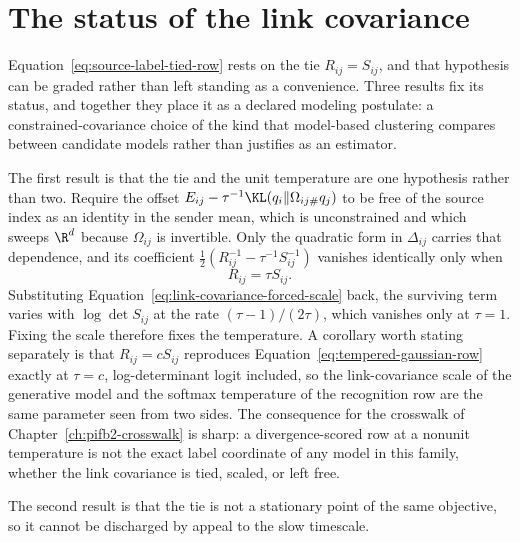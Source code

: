 \section{The status of the link covariance}
\label{sec:link-covariance-status}

Equation~\eqref{eq:source-label-tied-row} rests on the tie \(R_{ij}=S_{ij}\), and that hypothesis can be graded rather than left standing as a convenience. Three results fix its status, and together they place it as a declared modeling postulate: a constrained-covariance choice of the kind that model-based clustering compares between candidate models rather than justifies as an estimator.

The first result is that the tie and the unit temperature are one hypothesis rather than two. Require the offset \(E_{ij}-\tau^{-1}\KL(q_i\Vert\Omega_{ij\#}q_j)\) to be free of the source index as an identity in the sender mean, which is unconstrained and which sweeps \(\R^d\) because \(\Omega_{ij}\) is invertible. Only the quadratic form in \(\Delta_{ij}\) carries that dependence, and its coefficient \(\tfrac12(R_{ij}^{-1}-\tau^{-1}S_{ij}^{-1})\) vanishes identically only when
\begin{equation}
R_{ij}=\tau S_{ij}.
\label{eq:link-covariance-forced-scale}
\end{equation}
Substituting Equation~\eqref{eq:link-covariance-forced-scale} back, the surviving term varies with \(\log\det S_{ij}\) at the rate \((\tau-1)/(2\tau)\), which vanishes only at \(\tau=1\). Fixing the scale therefore fixes the temperature. A corollary worth stating separately is that \(R_{ij}=cS_{ij}\) reproduces Equation~\eqref{eq:tempered-gaussian-row} exactly at \(\tau=c\), log-determinant logit included, so the link-covariance scale of the generative model and the softmax temperature of the recognition row are the same parameter seen from two sides. The consequence for the crosswalk of Chapter~\ref{ch:pifb2-crosswalk} is sharp: a divergence-scored row at a nonunit temperature is not the exact label coordinate of any model in this family, whether the link covariance is tied, scaled, or left free.

The second result is that the tie is not a stationary point of the same objective, so it cannot be discharged by appeal to the slow timescale.

